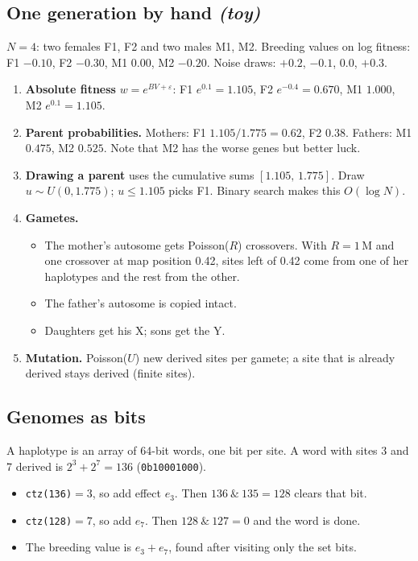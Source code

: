 \subsection{One generation by hand \emph{(toy)}}
$N=4$: two females F1, F2 and two males M1, M2. Breeding values on log fitness: F1 $-0.10$, F2 $-0.30$, M1 $0.00$, M2 $-0.20$. Noise draws: $+0.2$, $-0.1$, $0.0$, $+0.3$.
\begin{enumerate}
\item \textbf{Absolute fitness} $w=e^{BV+\varepsilon}$: F1 $e^{0.1}=1.105$, F2 $e^{-0.4}=0.670$, M1 $1.000$, M2 $e^{0.1}=1.105$.
\item \textbf{Parent probabilities.} Mothers: F1 $1.105/1.775=0.62$, F2 $0.38$. Fathers: M1 $0.475$, M2 $0.525$. Note that M2 has the worse genes but better luck.
\item \textbf{Drawing a parent} uses the cumulative sums $[1.105,\,1.775]$. Draw $u\sim U(0,1.775)$; $u\le1.105$ picks F1. Binary search makes this $O(\log N)$.
\item \textbf{Gametes.}
  \begin{itemize}
  \item The mother's autosome gets Poisson($R$) crossovers. With $R=1$\,M and one crossover at map position 0.42, sites left of 0.42 come from one of her haplotypes and the rest from the other.
  \item The father's autosome is copied intact.
  \item Daughters get his X; sons get the Y.
  \end{itemize}
\item \textbf{Mutation.} Poisson($U$) new derived sites per gamete; a site that is already derived stays derived (finite sites).
\end{enumerate}

\subsection{Genomes as bits}
A haplotype is an array of 64-bit words, one bit per site. A word with sites 3 and 7 derived is $2^3+2^7=136$ (\texttt{0b10001000}).
\begin{itemize}
\item \texttt{ctz(136)}$=3$, so add effect $e_3$. Then $136\ \&\ 135=128$ clears that bit.
\item \texttt{ctz(128)}$=7$, so add $e_7$. Then $128\ \&\ 127=0$ and the word is done.
\item The breeding value is $e_3+e_7$, found after visiting only the set bits.
\end{itemize}

